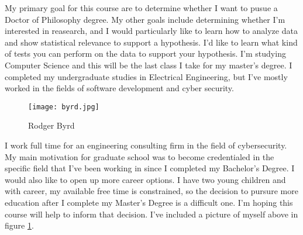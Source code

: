 My primary goal for this course are to determine whether I want to pusue a Doctor of Philosophy degree. My other goals include determining whether I'm interested in reasearch, and I would particularly like to learn how to analyze data and show statistical relevance to support a hypothesis. I'd like to learn what kind of tests you can perform on the data to support your hypothesis. I'm studying Computer Science and this will be the last class I take for my master's degree. I completed my undergraduate studies in Electrical Engineering, but I've mostly worked in the fields of software development and cyber security.
\begin{figure}
  \centerline{\texttt{[image: byrd.jpg]}}
  \caption{Rodger Byrd}
  \label{fig:HS}
\end{figure} 
I work full time for an engineering consulting firm in the field of cybersecurity. My main motivation for graduate school was to become credentialed in the specific field that I've been working in since I completed my Bachelor's Degree. I would also like to open up more career options. I have two young children and with career, my available free time is constrained, so the decision to pursure more education after I complete my Master's Degree is a difficult one. I'm hoping this course will help to inform that decision. I've included a picture of myself above in figure \ref{fig:HS}.